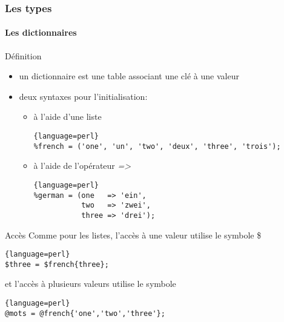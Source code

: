 \begin{frame}[fragile]
  \frametitle{Les types}
  \framesubtitle{Les dictionnaires}

  \begin{block}{Définition}
    \begin{itemize}
    \item un dictionnaire est une table associant une clé à une valeur
    \item deux syntaxes pour l'initialisation:
      \begin{itemize}
      \item à l'aide d'une liste
        \begin{lstlisting}{language=perl}
%french = ('one', 'un', 'two', 'deux', 'three', 'trois');
        \end{lstlisting}
      \item à l'aide de l'opérateur \textit{=>}
        \begin{lstlisting}{language=perl}
%german = (one   => 'ein',
           two   => 'zwei',
           three => 'drei');
        \end{lstlisting}
      \end{itemize}
    \end{itemize}
  \end{block}

  \begin{exampleblock}{Accès}
    Comme pour les listes, l'accès à une valeur utilise le symbole \$
    \begin{lstlisting}{language=perl}
$three = $french{three};
    \end{lstlisting}
    et l'accès à plusieurs valeurs utilise le symbole \@
    \begin{lstlisting}{language=perl}
@mots = @french{'one','two','three'};
    \end{lstlisting}
  \end{exampleblock}

\end{frame}

